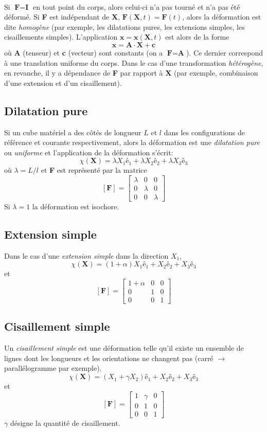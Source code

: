 \paragraph{}
Si $\textbf{F}=\textbf{I}$ en tout point du corps, alors celui-ci n'a pas tourné et n'a pas été déformé. Si \textbf{F} est indépendant de \textbf{X}, $\textbf{F}(\textbf{X},t)=\textbf{F}(t)$, alors la déformation est dite \emph{homogène} (par exemple, les dilatations pures, les extensions simples, les cisaillements simples). L'application $\textbf{x}=\textbf{x}(\textbf{X},t)$ est alors de la forme $$\textbf{x}=\textbf{A}\cdot\textbf{X}+\textbf{c}$$ où \textbf{A} (tenseur) et \textbf{c} (vecteur) sont constants (on a $\textbf{F}=\textbf{A}$). Ce dernier correspond à une translation uniforme du corps. Dans le cas d'une transformation \emph{hétérogène}, en revanche, il y a dépendance de \textbf{F} par rapport à \textbf{X} (par exemple, combinaison d'une extension et d'un cisaillement).
\subsection{Dilatation pure}
Si un cube matériel a des côtés de longueur $L$ et $l$ dans les configurations de référence et courante respectivement, alors la déformation est une \emph{dilatation pure} ou \emph{uniforme} et l'application de la déformation s'écrit:
$$\chi(\textbf{X})=\lambda X_1\textbf{ê}_1+\lambda X_2\textbf{ê}_2+\lambda X_3\textbf{ê}_3$$ où $\lambda=L/l$ et \textbf{F} est représenté par la matrice 
$$[\textbf{F}]=\left[\begin{array}{ccc}
\lambda&0&0\\
0&\lambda&0\\
0&0&\lambda
\end{array}\right]$$ Si $\lambda=1$ la déformation est isochore.
\subsection{Extension simple}
Dans le cas d'une \emph{extension simple} dans la direction $X_1$, $$\chi(\textbf{X})=(1+\alpha)X_1\textbf{ê}_1+X_2\textbf{ê}_2+X_3\textbf{ê}_3$$ et $$[\textbf{F}]=\left[\begin{array}{ccc}
1+\alpha&0&0\\
0&1&0\\
0&0&1
\end{array}\right]$$
\subsection{Cisaillement simple}
\label{cisaillement}
Un \emph{cisaillement simple} est une déformation telle qu'il existe un ensemble de lignes dont les longueurs et les orientations ne changent pas (carré $\longrightarrow$ parallélogramme par exemple). 
$$\chi(\textbf{X})=(X_1+\gamma X_2)\textbf{ê}_1+X_2\textbf{ê}_2+X_3\textbf{ê}_3$$
et
$$[\textbf{F}]=\left[\begin{array}{ccc}
1&\gamma&0\\
0&1&0\\
0&0&1
\end{array}\right]$$ $\gamma$ désigne la quantité de cisaillement.

